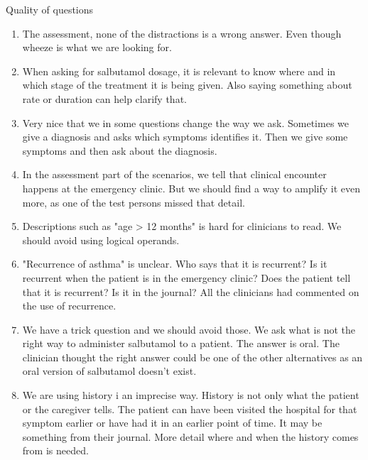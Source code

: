 Quality of questions
\begin{enumerate}
	\item The assessment, none of the distractions is a wrong answer. Even though wheeze is what we are looking for.
	\item When asking for salbutamol dosage, it is relevant to know where and in which stage of the treatment it is being given. Also saying something about rate or duration can help clarify that.
	\item Very nice that we in some questions change the way we ask. Sometimes we give a diagnosis and asks which symptoms identifies it. Then we give some symptoms and then ask about the diagnosis.
	\item In the assessment part of the scenarios, we tell that clinical encounter happens at the emergency clinic. But we should find a way to amplify it even more, as one of the test persons missed that detail.
	\item Descriptions such as "age > 12 months" is hard for clinicians to read. We should avoid using logical operands.
	\item "Recurrence of asthma" is unclear. Who says that it is recurrent? Is it recurrent when the patient is in the emergency clinic? Does the patient tell that it is recurrent? Is it in the journal? All the clinicians had commented on the use of recurrence.
	\item We have a trick question and we should avoid those. We ask what is not the right way to administer salbutamol to a patient. The answer is oral. The clinician thought the right answer could be one of the other alternatives as an oral version of salbutamol doesn't exist.
	\item We are using history i an imprecise way. History is not only what the patient or the caregiver tells. The patient can have been visited the hospital for that symptom earlier or have had it in an earlier point of time. It may be something from their journal. More detail where and when the history comes from is needed. 
\end{enumerate}

